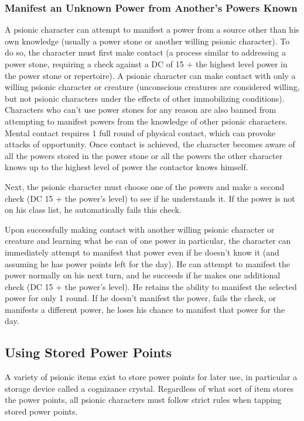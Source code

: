 \subsubsection{Manifest an Unknown Power from Another's Powers Known}
A psionic character can attempt to manifest a power from a source other than his own knowledge (usually a power stone or another willing psionic character). To do so, the character must first make contact (a process similar to addressing a power stone, requiring a  check against a DC of 15 + the highest level power in the power stone or repertoire). A psionic character can make contact with only a willing psionic character or creature (unconscious creatures are considered willing, but not psionic characters under the effects of other immobilizing conditions). Characters who can't use power stones for any reason are also banned from attempting to manifest powers from the knowledge of other psionic characters. Mental contact requires 1 full round of physical contact, which can provoke attacks of opportunity. Once contact is achieved, the character becomes aware of all the powers stored in the power stone or all the powers the other character knows up to the highest level of power the contactor knows himself.

Next, the psionic character must choose one of the powers and make a second  check (DC 15 + the power's level) to see if he understands it. If the power is not on his class list, he automatically fails this check.

Upon successfully making contact with another willing psionic character or creature and learning what he can of one power in particular, the character can immediately attempt to manifest that power even if he doesn't know it (and assuming he has power points left for the day). He can attempt to manifest the power normally on his next turn, and he succeeds if he makes one additional  check (DC 15 + the power's level). He retains the ability to manifest the selected power for only 1 round. If he doesn't manifest the power, fails the  check, or manifests a different power, he loses his chance to manifest that power for the day.

\subsection{Using Stored Power Points}
A variety of psionic items exist to store power points for later use, in particular a storage device called a cognizance crystal. Regardless of what sort of item stores the power points, all psionic characters must follow strict rules when tapping stored power points.

